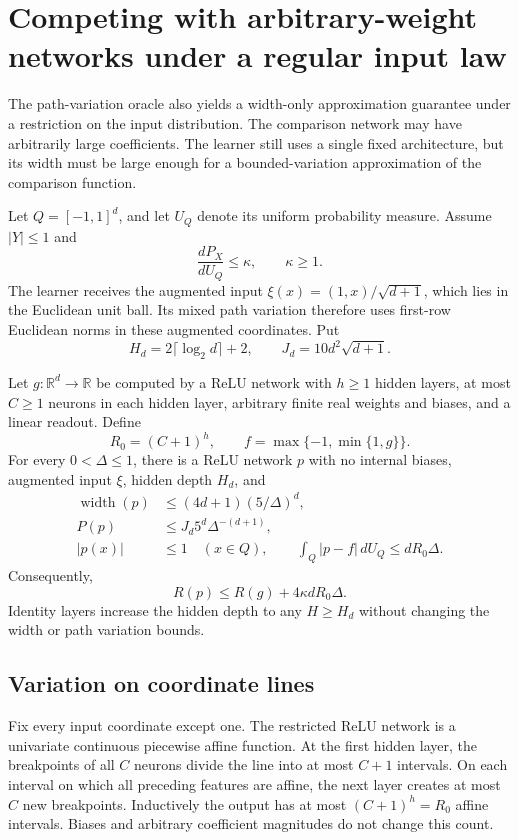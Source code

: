 \section{Competing with arbitrary-weight networks under a regular input law}
\label{sec:width-only-regular}
The path-variation oracle also yields a width-only approximation guarantee under a restriction on the input distribution. The comparison network may have arbitrarily large coefficients. The learner still uses a single fixed architecture, but its width must be large enough for a bounded-variation approximation of the comparison function.

Let $Q=[-1,1]^d$, and let $U_Q$ denote its uniform probability measure. Assume $|Y|\le1$ and
\[
 \frac{dP_X}{dU_Q}\le\kappa,\qquad \kappa\ge1.
\]
The learner receives the augmented input $\xi(x)=(1,x)/\sqrt{d+1}$, which lies in the Euclidean unit ball. Its mixed path variation therefore uses first-row Euclidean norms in these augmented coordinates. Put
\[
 H_d=2\lceil\log_2 d\rceil+2,\qquad
 J_d=10d^2\sqrt{d+1}.
\]

\begin{theorem}
\label{thm:width-only-approximation}
Let $g:\mathbb R^d\to\mathbb R$ be computed by a ReLU network with $h\ge1$ hidden layers, at most $C\ge1$ neurons in each hidden layer, arbitrary finite real weights and biases, and a linear readout. Define
\[
 R_0=(C+1)^h,\qquad f=\max\{-1,\min\{1,g\}\}.
\]
For every $0<\Delta\le1$, there is a ReLU network $p$ with no internal biases, augmented input $\xi$, hidden depth $H_d$, and
\begin{align}
 \operatorname{width}(p)&\le(4d+1)(5/\Delta)^d,\label{eq:width-only-width}\\
 P(p)&\le J_d5^d\Delta^{-(d+1)},\label{eq:width-only-path}\\
 |p(x)|&\le1\quad(x\in Q),\qquad
 \int_Q|p-f|\,dU_Q\le dR_0\Delta.\label{eq:width-only-error}
\end{align}
Consequently,
\begin{equation}
 R(p)\le R(g)+4\kappa dR_0\Delta.
 \label{eq:width-only-risk}
\end{equation}
Identity layers increase the hidden depth to any $H\ge H_d$ without changing the width or path variation bounds.
\end{theorem}

\subsection{Variation on coordinate lines}
Fix every input coordinate except one. The restricted ReLU network is a univariate continuous piecewise affine function. At the first hidden layer, the breakpoints of all $C$ neurons divide the line into at most $C+1$ intervals. On each interval on which all preceding features are affine, the next layer creates at most $C$ new breakpoints. Inductively the output has at most $(C+1)^h=R_0$ affine intervals. Biases and arbitrary coefficient magnitudes do not change this count.

